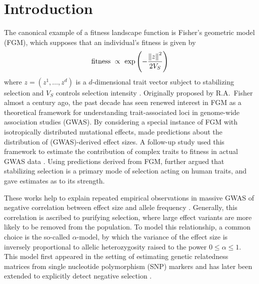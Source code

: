 \documentclass[10pt]{article}
\begin{document}
\section{Introduction}
The canonical example of a fitness landscape function is Fisher's geometric model (FGM), which supposes that an individual's fitness is given by
\begin{align} \label{eq:fitness}
    \text{fitness} \ \propto \
    \exp \left(
        -\frac{\left\| z \right\|^2}{2V_S} 
    \right)
\end{align}
where $z=(z^1, \ldots, z^d)$ is a $d$-dimensional trait vector subject to stabilizing selection and $V_S$ controls selection intensity \citep{fisher1999thegeneticaltheoryof,Tenaillon_2014}. 
Originally proposed by R.A.~Fisher almost a century ago, the past decade has seen renewed interest in FGM as a theoretical framework for understanding trait-associated loci in genome-wide association studies (GWAS).
By considering a special instance of FGM with isotropically distributed mutational effects, \citet{Simons2018popgeninterpretation} made predictions about the distribution of (GWAS)-derived effect sizes.  
A follow-up study used this framework to estimate the contribution of complex traits to fitness in actual GWAS data \citep{Simons2025scalinglaw}.
Using predictions derived from FGM, \citet{Koch2024} further argued that stabilizing selection is a primary mode of selection acting on human traits, and gave estimates as to its strength.

These works help to explain repeated empirical observations 
in massive GWAS of negative correlation between effect size and allele frequency \citep{Zeng_2018, Schoech_2019, Priv__2020}.
Generally, this correlation is ascribed to purifying selection, where large effect variants are more likely to be removed from the population.
To model this relationship, a common choice is the so-called $\alpha$-model, by which the variance of the effect size is inversely proportional to allelic heterozygosity raised to the power $0\le \alpha \le 1$.
This model first appeared in the setting of estimating genetic relatedness matrices from single nucleotide polymorphism (SNP) markers and has later been extended to explicitly detect negative selection \citep{Zeng_2018, Schoech_2019}.
\end{document}
